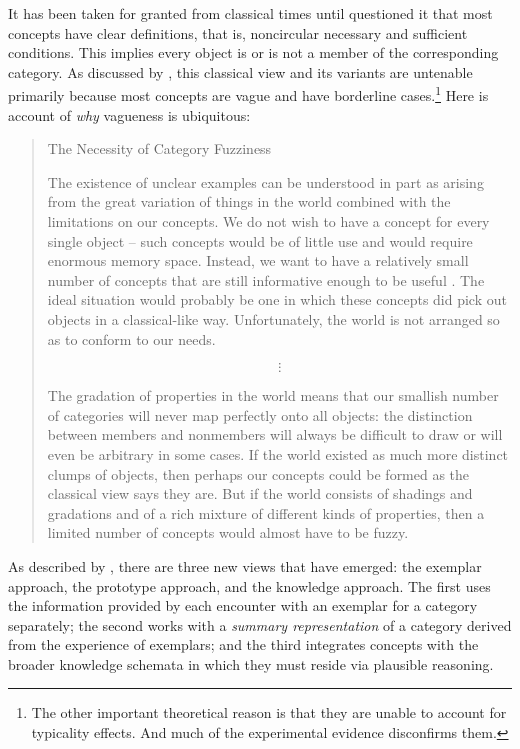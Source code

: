 It has been taken for granted from classical times until \citet[Sections~66 and 67, pages~31--32]{wittgenstein:pi} questioned it that most concepts have clear definitions, that is, noncircular necessary and sufficient conditions. This implies every object is or is not a member of the corresponding category. As discussed by \citet{sm:cc}, this classical view and its variants are untenable primarily because most concepts are vague and have borderline cases.\footnote{The other important theoretical reason is that they are unable to account for typicality effects. And much of the experimental evidence disconfirms them.} Here is  account of \emph{why} vagueness is ubiquitous:

\begin{quote}

The Necessity of Category Fuzziness

The existence of unclear examples can be understood in part as arising from the great variation of things in the world combined with the limitations on our concepts. We do not wish to have a concept for every single object -- such concepts would be of little use and would require enormous memory space. Instead, we want to have a relatively small number of concepts that are still informative enough to be useful \citep{rosch:pc}. The ideal situation would probably be one in which these concepts did pick out objects in a classical-like way. Unfortunately, the world is not arranged so as to conform to our needs.

\[\vdots\]

The gradation of properties in the world means that our smallish number of categories will never map perfectly onto all objects: the distinction between members and nonmembers will always be difficult to draw or will even be arbitrary in some cases. If the world existed as much more distinct clumps of objects, then perhaps our concepts could be formed as the classical view says they are. But if the world consists of shadings and gradations and of a rich mixture of different kinds of properties, then a limited number of concepts would almost have to be fuzzy.

\end{quote}

As described by \citet[Chapter~3]{murphy:bbc}, there are three new views that have emerged: the exemplar approach, the prototype approach, and the knowledge approach. The first uses the information provided by each encounter with an exemplar for a category separately; the second works with a \emph{summary representation} of a category derived from the experience of exemplars; and the third integrates concepts with the broader knowledge schemata in which they must reside via plausible reasoning. 

